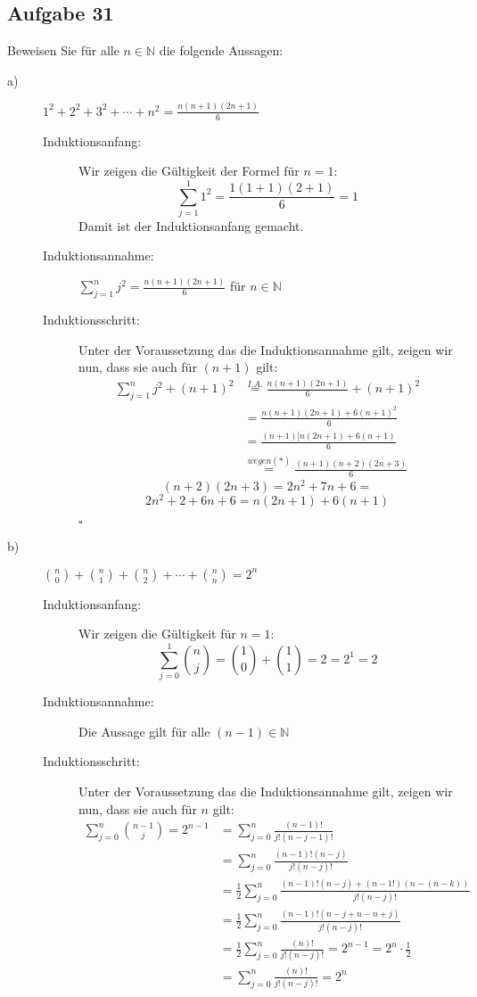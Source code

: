 \documentclass[12pt,a4paper,leqno]{article}
\begin{document}
\subsection*{Aufgabe 31}
Beweisen Sie für alle $n \in \mathbb{N}$ die folgende Aussagen:
\begin{description}
\item[a)] $1^2+2^2+3^2+\cdots+n^2=\frac{n(n+1)(2n+1)}{6}$
\begin{description}
	\item[Induktionsanfang: ]Wir zeigen die Gültigkeit der Formel für $n = 1$:
	$$\sum \limits _{j =1}^1 1^2= \frac{1(1+1)(2+1)}{6}=1$$
							Damit ist der Induktionsanfang gemacht.
	\item[Induktionsannahme:] $\sum \limits _{j =1}^n j^2 = \frac{n(n+1)(2n+1)}{6}$ für $n \in \mathbb{N}$
	\item[Induktionsschritt: ]Unter der Voraussetzung das die Induktionsannahme gilt, zeigen wir nun, dass sie auch für $(n+1)$ gilt:
		\begin{align*} \sum \limits _{j =1}^n j^2 + (n+1)^2 &\overset {I.A.}{=} \frac{n(n+1)(2n+1)}{6} + (n+1)^2 \\&= \frac{n(n+1)(2n+1)+6(n+1)^2}{6} \\ &=\frac{(n+1)[n(2n+1)+6(n+1)}{6} \\ &\overset {wegen (*)}{=}\frac{(n+1)(n+2)(2n+3)}{6} \end{align*}
	\renewcommand{\theequation}{*}
	 \begin{equation}
	 (n+2)(2n+3)=2n^2+7n+6=
	 \end{equation}
	 $$2n^2+2+6n+6=n(2n+1)+6(n+1)$$
	\begin{flushright}$ \square $ \end{flushright} 
	\newpage
\end{description}
	\item[b)]$\binom {n}{0}+\binom {n}{1}+\binom {n}{2}+\cdots + \binom {n}{n}=2^n $
		\begin{description}
			\item[Induktionsanfang: ] Wir zeigen die Gültigkeit für $n=1$:
			$$\sum \limits _{j =0}^1 \binom {n}{j} = \binom {1}{0}+ \binom {1}{1}=2=2^1=2$$
			\item[Induktionsannahme: ]Die Aussage gilt für alle $(n-1) \in \mathbb{N}$
			\item[Induktionsschritt: ]Unter der Voraussetzung das die Induktionsannahme gilt, zeigen wir nun, dass sie auch für $n$ gilt:
			\begin{align*} \sum \limits _{j =0}^n \binom {n-1}{j} = 2^{n-1} &= \sum \limits _{j =0}^n\frac{(n-1)!}{j!(n-j-1)!} \\&=  \sum \limits _{j =0}^n\frac{(n-1)!(n-j)}{j!(n-j)!} \\&= \frac{1}{2}\sum \limits _{j =0}^n\frac{(n-1)!(n-j)+(n-1!)(n-(n-k))}{j!(n-j)!} \\&=  \frac{1}{2} \sum \limits _{j =0}^n\frac{(n-1)!(n-j+n-n+j)}{j!(n-j)!} \\&= \frac{1}{2} \sum \limits _{j =0}^n\frac{(n)!}{j!(n-j)!} = 2^{n-1}=2^n \cdot \frac{1}{2} \\&=  \sum \limits _{j =0}^n\frac{(n)!}{j!(n-j)!}=2^n\end{align*}

\end{description}
\end{description}
\end{document}
